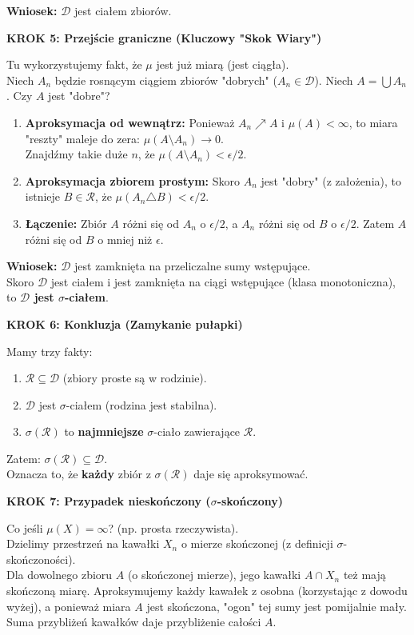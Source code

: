 \textbf{Wniosek:} $\mathcal{D}$ jest ciałem zbiorów.

\textbf{KROK 5: Przejście graniczne (Kluczowy "Skok Wiary")}

Tu wykorzystujemy fakt, że $\mu$ jest już miarą (jest ciągła).\\
Niech $A_n$ będzie rosnącym ciągiem zbiorów "dobrych" ($A_n \in \mathcal{D}$). Niech $A = \bigcup A_n$. Czy $A$ jest "dobre"?

\begin{enumerate}
    \item \textbf{Aproksymacja od wewnątrz:} Ponieważ $A_n \nearrow A$ i $\mu(A) < \infty$, to miara "reszty" maleje do zera: $\mu(A \setminus A_n) \to 0$.\\
    Znajdźmy takie duże $n$, że $\mu(A \setminus A_n) < \epsilon/2$.
    \item \textbf{Aproksymacja zbiorem prostym:} Skoro $A_n$ jest "dobry" (z założenia), to istnieje $B \in \mathcal{R}$, że $\mu(A_n \triangle B) < \epsilon/2$.
    \item \textbf{Łączenie:} Zbiór $A$ różni się od $A_n$ o $\epsilon/2$, a $A_n$ różni się od $B$ o $\epsilon/2$. Zatem $A$ różni się od $B$ o mniej niż $\epsilon$.
\end{enumerate}

\textbf{Wniosek:} $\mathcal{D}$ jest zamknięta na przeliczalne sumy wstępujące.\\
Skoro $\mathcal{D}$ jest ciałem i jest zamknięta na ciągi wstępujące (klasa monotoniczna), to \textbf{$\mathcal{D}$ jest $\sigma$-ciałem}.

\textbf{KROK 6: Konkluzja (Zamykanie pułapki)}

Mamy trzy fakty:
\begin{enumerate}
    \item $\mathcal{R} \subseteq \mathcal{D}$ (zbiory proste są w rodzinie).
    \item $\mathcal{D}$ jest $\sigma$-ciałem (rodzina jest stabilna).
    \item $\sigma(\mathcal{R})$ to \textbf{najmniejsze} $\sigma$-ciało zawierające $\mathcal{R}$.
\end{enumerate}

Zatem: $\sigma(\mathcal{R}) \subseteq \mathcal{D}$.\\
Oznacza to, że \textbf{każdy} zbiór z $\sigma(\mathcal{R})$ daje się aproksymować.

\textbf{KROK 7: Przypadek nieskończony ($\sigma$-skończony)}

Co jeśli $\mu(X) = \infty$? (np. prosta rzeczywista).\\
Dzielimy przestrzeń na kawałki $X_n$ o mierze skończonej (z definicji $\sigma$-skończoności).\\
Dla dowolnego zbioru $A$ (o skończonej mierze), jego kawałki $A \cap X_n$ też mają skończoną miarę. Aproksymujemy każdy kawałek z osobna (korzystając z dowodu wyżej), a ponieważ miara $A$ jest skończona, "ogon" tej sumy jest pomijalnie mały. Suma przybliżeń kawałków daje przybliżenie całości $A$.


